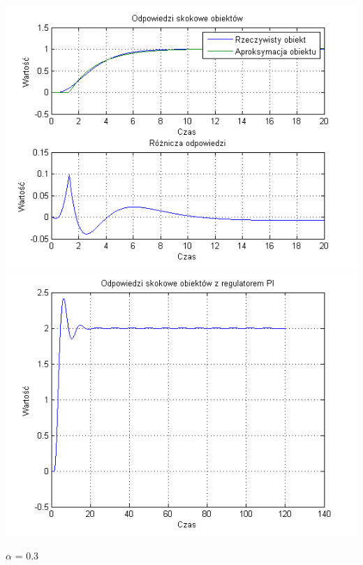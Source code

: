 \documentclass[10pt,a4paper]{article}
\begin{document}
\begin{center}
\includegraphics[scale=1]{images/jeden/skrypt_227.png}\\
\includegraphics[scale=1]{images/jeden/skrypt_228.png}\\
\end{center}
\newpage
$\alpha$ = 0.3
\end{document}
